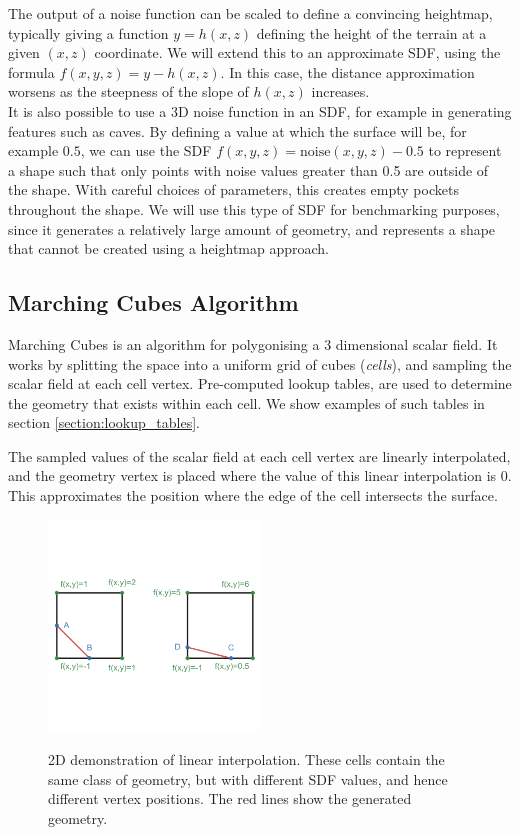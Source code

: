 \documentclass[11pt]{article}
\begin{document}
The output of a noise function can be scaled to define a convincing heightmap, typically giving a function $y = h\left(x,z\right)$ defining the height of the terrain at a given $\left(x,z\right)$ coordinate. We will extend this to an approximate SDF, using the formula $f\left(x,y,z\right) = y - h\left(x,z\right)$. In this case, the distance approximation worsens as the steepness of the slope of $h\left(x,z\right)$ increases.
\\
It is also possible to use a 3D noise function in an SDF, for example in generating features such as caves. By defining a value at which the surface will be, for example $0.5$, we can use the SDF $f\left(x,y,z\right) = \mathrm{noise}\left(x,y,z\right) - 0.5$ to represent a shape such that only points with noise values greater than 0.5 are outside of the shape. With careful choices of parameters, this creates empty pockets throughout the shape. We will use this type of SDF for benchmarking purposes, since it generates a relatively large amount of geometry, and represents a shape that cannot be created using a heightmap approach. 

\subsection{Marching Cubes Algorithm}
\label{section:mc}
Marching Cubes is an algorithm for polygonising a 3 dimensional scalar field. It works by splitting the space into a uniform grid of cubes (\textit{cells}), and sampling the scalar field at each cell vertex. Pre-computed lookup tables, are used to determine the geometry that exists within each cell. We show examples of such tables in section \ref{section:lookup_tables}. 

The sampled values of the scalar field at each cell vertex are linearly interpolated, and the geometry vertex is placed where the value of this linear interpolation is 0. This approximates the position where the edge of the cell intersects the surface.

\begin{figure}
  \caption{2D demonstration of linear interpolation. These cells contain the same class of geometry, but with different SDF values, and hence different vertex positions. The red lines show the generated geometry.}
  \includegraphics[width=0.5\textwidth]{linear_interpolation.png}
  \label{fig:linear_interpolation}
\end{figure}
\end{document}
